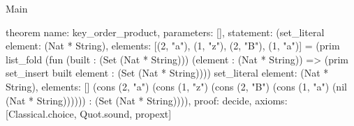 \begin{lexlean}{Main}
\begin{semanticmodule}
theorem{
  name: key_order_product,
  parameters: [],
  statement: (set_literal{
    element: (Nat * String),
    elements: [(2, "a"), (1, "z"), (2, "B"), (1, "a")]
  } = (prim list_fold (fun (built : (Set (Nat * String))) (element : (Nat * String)) => (prim set_insert built element : (Set (Nat * String)))) set_literal{
    element: (Nat * String),
    elements: []
  } (cons (2, "a") (cons (1, "z") (cons (2, "B") (cons (1, "a") (nil (Nat * String)))))) : (Set (Nat * String)))),
  proof: decide{},
  axioms: [Classical.choice, Quot.sound, propext]
}
\end{semanticmodule}
\end{lexlean}
